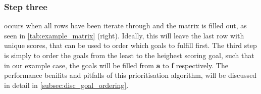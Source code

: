 \subsubsection{Step three}occurs when all rows have been iterate through and the matrix is filled out, as seen in \cref{tab:example_matrix} (right). Ideally, this will leave the last row with unique scores, that can be used to order which goals to fulfill first. The third step is simply to order the goals from the least to the heighest scoring goal, such that in our example case, the goals will be filled from \textbf{a} to \textbf{f} respectively.
The performance benifits and pitfalls of this prioritisation algorithm, will be discussed in detail in \cref{subsec:disc_goal_ordering}.
%







